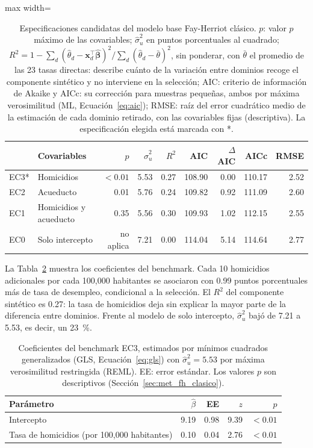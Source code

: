 \begin{table}[!htbp]
\centering
\small
\caption{Especificaciones candidatas del modelo base Fay-Herriot clásico. $p$: valor $p$ máximo de las covariables; $\hat{\sigma}_u^2$ en puntos porcentuales al cuadrado; $R^2 = 1 - \sum_d(\hat{\theta}_d - \mathbf{x}_d^\top\hat{\boldsymbol{\beta}})^2 / \sum_d(\hat{\theta}_d - \bar{\theta})^2$, sin ponderar, con $\bar{\theta}$ el promedio de las 23 tasas directas: describe cuánto de la variación entre dominios recoge el componente sintético y no interviene en la selección; AIC: criterio de información de Akaike y AICc: su corrección para muestras pequeñas, ambos por máxima verosimilitud (ML, Ecuación~\ref{eq:aic}); RMSE: raíz del error cuadrático medio de la estimación de cada dominio retirado, con las covariables fijas (descriptiva). La especificación elegida está marcada con *.}
\label{tab:res_especificaciones}
\begin{adjustbox}{max width=\linewidth}
\begin{tabular}{l l r r r r r r r}
\toprule
 & Covariables & $p$ & $\hat{\sigma}_u^2$ & $R^2$ & AIC & $\Delta$AIC & AICc & RMSE \\
\midrule
EC3* & Homicidios & $<0.01$ & 5.53 & 0.27 & 108.90 & 0.00 & 110.17 & 2.52 \\
EC2 & Acueducto & 0.01 & 5.76 & 0.24 & 109.82 & 0.92 & 111.09 & 2.60 \\
EC1 & Homicidios y acueducto & 0.35 & 5.56 & 0.30 & 109.93 & 1.02 & 112.15 & 2.55 \\
EC0 & Solo intercepto & no aplica & 7.21 & 0.00 & 114.04 & 5.14 & 114.64 & 2.77 \\
\bottomrule
\end{tabular}
\end{adjustbox}
\end{table}

La Tabla~\ref{tab:res_coeficientes} muestra los coeficientes del benchmark. Cada 10 homicidios adicionales por cada 100,000 habitantes se asociaron con 0.99 puntos porcentuales más de tasa de desempleo, condicional a la selección. El $R^2$ del componente sintético es 0.27: la tasa de homicidios deja sin explicar la mayor parte de la diferencia entre dominios. Frente al modelo de solo intercepto, $\hat{\sigma}_u^2$ bajó de 7.21 a 5.53, es decir, un 23~\%.

\begin{table}[!htbp]
\centering
\small
\caption{Coeficientes del benchmark EC3, estimados por mínimos cuadrados generalizados (GLS, Ecuación~\ref{eq:gls}) con $\hat{\sigma}_u^2 = 5.53$ por máxima verosimilitud restringida (REML). EE: error estándar. Los valores $p$ son descriptivos (Sección~\ref{sec:met_fh_clasico}).}
\label{tab:res_coeficientes}
\begin{tabular}{l r r r r}
\toprule
Parámetro & $\hat{\beta}$ & EE & $z$ & $p$ \\
\midrule
Intercepto & 9.19 & 0.98 & 9.39 & $<0.01$ \\
Tasa de homicidios (por 100,000 habitantes) & 0.10 & 0.04 & 2.76 & $<0.01$ \\
\bottomrule
\end{tabular}
\end{table}

